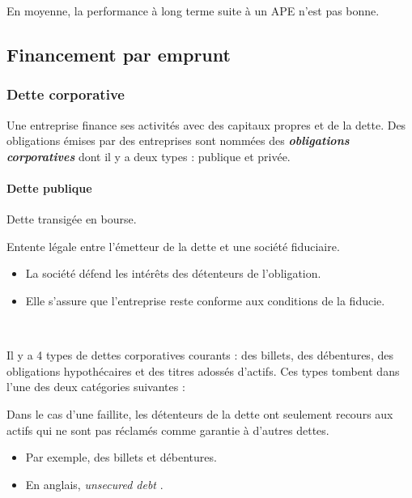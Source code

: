 \documentclass[10pt, french]{article}
\begin{document}
\begin{multicols*}{2}
\begin{definitionNOHFILLpropos}
En moyenne, la performance à long terme suite à un APE n'est pas bonne.
\end{definitionNOHFILLpropos}


\columnbreak
\subsection{Financement par emprunt}
\subsubsection{Dette corporative}
Une entreprise finance ses activités avec des capitaux propres et de la dette. Des obligations émises par des entreprises sont nommées des \textbf{\textit{obligations corporatives}} dont il y a deux types : publique et privée.

\paragraph{Dette publique} Dette transigée en bourse.

\begin{definitionNOHFILL}[Fiducie]
Entente légale entre l'émetteur de la dette et une société fiduciaire.
\begin{itemize}
	\item	La société défend les intérêts des détenteurs de l'obligation.
	\item	Elle s'assure que l'entreprise reste conforme aux conditions de la fiducie.
\end{itemize}
\end{definitionNOHFILL}

\

Il y a 4 types de dettes corporatives courants : des billets, des débentures, des obligations hypothécaires et des titres adossés d'actifs. Ces types tombent dans l'une des deux catégories suivantes : 

\begin{definitionNOHFILLprop}
Dans le cas d'une faillite, les détenteurs de la dette ont seulement recours aux actifs qui ne sont pas réclamés comme garantie à d'autres dettes.

\begin{itemize}
	\item	Par exemple, des billets et débentures.
	\item	En anglais, \og \textit{unsecured debt} \fg{}.
\end{itemize}
\end{definitionNOHFILLprop}


\end{multicols*}
\end{document}
